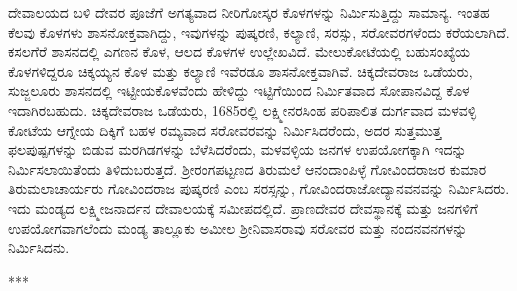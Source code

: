 ದೇವಾಲಯದ ಬಳಿ ದೇವರ ಪೂಜೆಗೆ ಅಗತ್ಯವಾದ ನೀರಿಗೋಸ್ಕರ ಕೊಳಗಳನ್ನು ನಿರ್ಮಿಸುತ್ತಿದ್ದು ಸಾಮಾನ್ಯ. ಇಂತಹ ಕೆಲವು ಕೊಳಗಳು ಶಾಸನೋಕ್ತವಾಗಿದ್ದು, ಇವುಗಳನ್ನು ಪುಷ್ಕರಣಿ, ಕಲ್ಯಾಣಿ, ಸರಸ್ಸು, ಸರೋವರಗಳೆಂದು ಕರೆಯಲಾಗಿದೆ. ಕಸಲಗೆರೆ ಶಾಸನದಲ್ಲಿ ಎಗಣನ ಕೊಳ, ಆಲದ ಕೊಳಗಳ ಉಲ್ಲೇಖವಿದೆ. ಮೇಲುಕೋಟೆಯಲ್ಲಿ ಬಹುಸಂಖ್ಯೆಯ ಕೊಳಗಳಿದ್ದರೂ ಚಿಕ್ಕಯ್ಯನ ಕೊಳ ಮತ್ತು ಕಲ್ಯಾಣಿ ಇವೆರಡೂ ಶಾಸನೋಕ್ತವಾಗಿವೆ. ಚಿಕ್ಕದೇವರಾಜ ಒಡೆಯರು, ಸುಜ್ಜಲೂರು ಶಾಸನದಲ್ಲಿ ಇಟ್ಟೀಯಕೊಳವೆಂದು ಹೇಳಿದ್ದು ಇಟ್ಟಿಗೆಯಿಂದ ನಿರ್ಮಿತವಾದ ಸೋಪಾನವಿದ್ದ ಕೊಳ ಇದಾಗಿರಬಹುದು. ಚಿಕ್ಕದೇವರಾಜ ಒಡೆಯರು, 1685ರಲ್ಲಿ ಲಕ್ಷ್ಮೀನರಸಿಂಹ ಪರಿಪಾಲಿತ ದುರ್ಗವಾದ ಮಳವಳ್ಳಿ ಕೋಟೆಯ ಆಗ್ನೇಯ ದಿಕ್ಕಿಗೆ ಬಹಳ ರಮ್ಯವಾದ ಸರೋವರವನ್ನು ನಿರ್ಮಿಸಿದರೆಂದು, ಅದರ ಸುತ್ತಮುತ್ತ ಫಲಪುಷ್ಪಗಳನ್ನು ಬಿಡುವ ಮರಗಿಡಗಳನ್ನು ಬೆಳೆಸಿದರೆಂದು, ಮಳವಳ್ಳಿಯ ಜನಗಳ ಉಪಯೋಗಕ್ಕಾಗಿ ಇದನ್ನು ನಿರ್ಮಿಸಲಾಯಿತೆಂದು ತಿಳಿದುಬರುತ್ತದೆ. ಶ‍್ರೀರಂಗಪಟ್ಟಣದ ತಿರುಮಲೆ ಆನಂದಾಂಪಿಳ್ಳೆ ಗೋವಿಂದರಾಜರ ಕುಮಾರ ತಿರುಮಲಾಚಾರ್ಯರು ಗೋವಿಂದರಾಜ ಪುಷ್ಕರಣಿ ಎಂಬ ಸರಸ್ಸನ್ನು, ಗೋವಿಂದರಾಜೋದ್ಯಾನವನವನ್ನು ನಿರ್ಮಿಸಿದರು. ಇದು ಮಂಡ್ಯದ ಲಕ್ಷ್ಮೀಜನಾರ್ದನ ದೇವಾಲಯಕ್ಕೆ ಸಮೀಪದಲ್ಲಿದೆ. ಪ್ರಾಣದೇವರ ದೇವಸ್ಥಾನಕ್ಕೆ ಮತ್ತು ಜನಗಳಿಗೆ ಉಪಯೋಗವಾಗಲೆಂದು ಮಂಡ್ಯ ತಾಲ್ಲೂಕು ಅಮೀಲ ಶ‍್ರೀನಿವಾಸರಾವು ಸರೋವರ ಮತ್ತು ನಂದನವನಗಳನ್ನು ನಿರ್ಮಿಸಿದನು.

\begin{center}
***
\end{center}

\theendnotes

